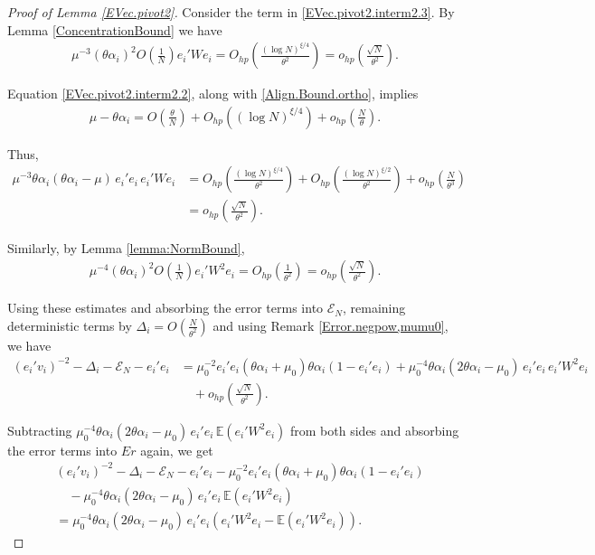 \documentclass[11pt, reqno]{amsart}
\numberwithin{equation}{section}
\begin{document}
\begin{proof}[Proof of Lemma \ref{EVec.pivot2}]
Consider the term in \eqref{EVec.pivot2.interm2.3}. By Lemma \ref{ConcentrationBound} we have
\begin{align}
\mu^{-3}(\theta\alpha_i)^2 O\left(\frac{1}{N}\right)e_i'We_i
= O_{hp}\left(\frac{(\log N)^{\xi/4}}{\theta^2}\right)
= o_{hp}\left(\frac{\sqrt{N}}{\theta^2}\right).
\end{align}

Equation \eqref{EVec.pivot2.interm2.2}, along with \eqref{Align.Bound.ortho}, implies
\begin{align}
\label{EVec.pivot2.interm2.1'}
\mu - \theta\alpha_i
= O\left(\frac{\theta}{N}\right) + O_{hp}\left((\log N)^{\xi/4}\right) + o_{hp}\left(\frac{N}{\theta}\right).
\end{align}

Thus,
\begin{align}
\label{EVec.pivot2.interm5}
\mu^{-3}\theta\alpha_i(\theta\alpha_i -\mu)\, e_i'e_i\,e_i'We_i
&= O_{hp}\left(\frac{(\log N)^{\xi/4}}{\theta^2}\right)
+ O_{hp}\left(\frac{(\log N)^{\xi/2}}{\theta^2}\right)
+ o_{hp}\left(\frac{N}{\theta^3}\right) \\
&= o_{hp}\left(\frac{\sqrt{N}}{\theta^2}\right).
\end{align}

Similarly, by Lemma \ref{lemma:NormBound},
\begin{align}
\mu^{-4}(\theta\alpha_i)^2 O\left(\frac{1}{N}\right)e_i'W^2 e_i
= O_{hp}\left(\frac{1}{\theta^2}\right)
= o_{hp}\left(\frac{\sqrt{N}}{\theta^2}\right).
\end{align}

Using these estimates and absorbing the error terms into $\mathcal E_N$, remaining deterministic terms by $\Delta_i = O\left(\frac{N}{\theta^2}\right)$ and using Remark \ref{Error.negpow,mumu0}, we have
\begin{align}
\nonumber
(e_i'v_i)^{-2} - \Delta_i - \mathcal{E}_N - e_i'e_i
&= \mu_0^{-2}e_i'e_i(\theta\alpha_i + \mu_0)\theta\alpha_i(1 - e_i'e_i)
+ \mu_0^{-4}\theta\alpha_i(2\theta\alpha_i - \mu_0)\, e_i'e_i\, e_i'W^2e_i \label{EVec.pivot2.interm4'} \\
&\quad + o_{hp}\left(\frac{\sqrt{N}}{\theta^2}\right).
\end{align}

Subtracting \(\mu_0^{-4}\theta\alpha_i(2\theta\alpha_i - \mu_0)\, e_i'e_i\, \mathbb{E}(e_i'W^2e_i)\) from both sides and absorbing the error terms into \( Er \) again, we get
\begin{align}
\nonumber
&(e_i'v_i)^{-2} - \Delta_i - \mathcal{E}_N - e_i'e_i
- \mu_0^{-2}e_i'e_i(\theta\alpha_i + \mu_0)\theta\alpha_i(1 - e_i'e_i) \\
&\quad - \mu_0^{-4}\theta\alpha_i(2\theta\alpha_i - \mu_0)\, e_i'e_i\, \mathbb{E}(e_i'W^2e_i) \\
&= \mu_0^{-4}\theta\alpha_i(2\theta\alpha_i - \mu_0)\, e_i'e_i\left(e_i'W^2e_i - \mathbb{E}(e_i'W^2e_i)\right).
\end{align}


\end{proof}
\end{document}
